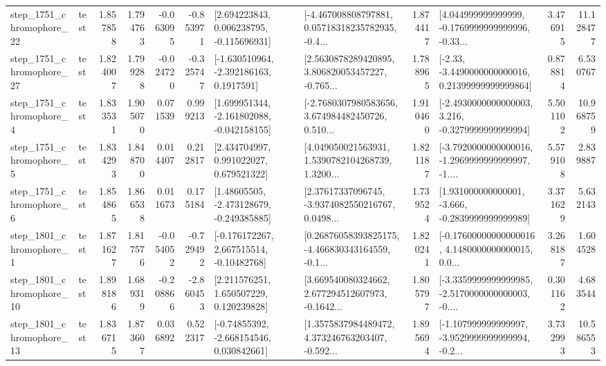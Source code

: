 \begin{tabular}{llrrrrllrlrr}
 step\_1751\_chromophore\_22 &      test &      1.857858 &    1.794763 &     -0.063095 & -0.853971 &    [2.694223843, 0.006238795, -0.115696931] &  [-4.467008808797881, 0.05718318235782935, -0.4... &       1.874417 &  [4.044999999999999, -0.1769999999999996, -0.33... &            3.476915 &         11.128477 \\
 step\_1751\_chromophore\_27 &      test &      1.824007 &    1.799288 &     -0.024720 & -0.325747 &     [-1.630510964, -2.392186163, 0.1917591] &  [2.5630878289420895, 3.806820053457227, -0.765... &       1.788965 &  [-2.33, -3.4490000000000016, 0.21399999999999864] &            0.878814 &          6.530767 \\
  step\_1751\_chromophore\_4 &      test &      1.833531 &    1.905070 &      0.071539 &  0.999213 &   [1.699951344, -2.161802088, -0.042158155] &  [-2.7680307980583656, 3.674984482450726, 0.510... &       1.910460 &  [-2.4930000000000003, 3.216, -0.3279999999999994] &            5.501102 &         10.968759 \\
  step\_1751\_chromophore\_5 &      test &      1.834293 &    1.848700 &      0.014407 &  0.212817 &     [2.434704997, 0.991022027, 0.679521322] &  [4.049050021563931, 1.5390782104268739, 1.3200... &       1.821187 &  [-3.7920000000000016, -1.2969999999999997, -1.... &            5.579108 &          2.839887 \\
  step\_1751\_chromophore\_6 &      test &      1.854865 &    1.866538 &      0.011673 &  0.175184 &    [1.48605505, -2.473128679, -0.249385885] &  [2.37617337096745, -3.9374082550216767, 0.0498... &       1.739524 &   [1.931000000000001, -3.666, -0.2839999999999989] &            3.371629 &          5.632143 \\
  step\_1801\_chromophore\_1 &      test &      1.871627 &    1.817576 &     -0.054052 & -0.729492 &    [-0.176172267, 2.667515514, -0.10482768] &  [0.26876058393825175, -4.466830343164559, -0.1... &       1.820241 &  [-0.17600000000000016, 4.1480000000000015, 0.0... &            3.268187 &          1.604528 \\
 step\_1801\_chromophore\_10 &      test &      1.898186 &    1.689319 &     -0.208866 & -2.860453 &     [2.211576251, 1.650507229, 0.120239828] &  [3.669540080324662, 2.677294512607973, -0.1642... &       1.805797 &  [-3.3359999999999985, -2.5170000000000003, -0.... &            0.301162 &          4.683544 \\
 step\_1801\_chromophore\_13 &      test &      1.836715 &    1.873607 &      0.036892 &  0.522317 &    [-0.74855392, -2.668154546, 0.030842661] &  [1.3575837984489472, 4.373246763203407, -0.592... &       1.895694 &  [-1.107999999999997, -3.9529999999999994, -0.2... &            3.732993 &         10.586553 \\

\end{tabular}
